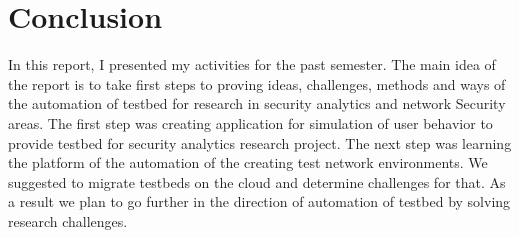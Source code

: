 
\section{Conclusion}

In this report, I presented my activities for the past semester. The main idea of the report is to take first steps to proving ideas, challenges, methods and ways of the automation of testbed for research in security analytics and network Security areas. The first step was creating application for simulation of user behavior to provide testbed for security analytics research project. The next step was learning the platform of the automation of the creating test network environments. We suggested to migrate testbeds on the cloud and determine challenges for that. As a result we plan to go further in the direction of automation of testbed by solving research challenges.
